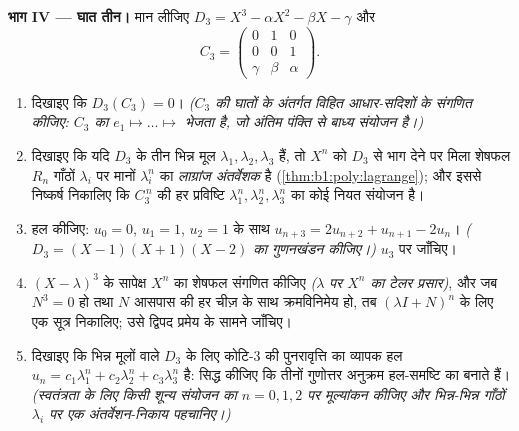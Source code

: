 \begin{problem}
\medskip \noindent\textbf{भाग IV --- घात तीन।} मान लीजिए $D_3 = X^3 - \alpha
X^2 - \beta X - \gamma$ और
\[
C_3 = \begin{pmatrix} 0 & 1 & 0\\ 0 & 0 & 1\\ \gamma & \beta &
\alpha \end{pmatrix}.
\]
\begin{enumerate}[resume]
  \item दिखाइए कि $D_3(C_3) = 0$। \emph{($C_3$ की घातों के अंतर्गत विहित
  आधार-सदिशों के  संगणित कीजिए: $C_3$ का  $e_1 \mapsto
  \dots \mapsto$ भेजता है, जो अंतिम पंक्ति से बाध्य संयोजन है।)}
  \item दिखाइए कि यदि $D_3$ के तीन भिन्न मूल $\lambda_1, \lambda_2,
  \lambda_3$ हैं, तो $X^n$ को $D_3$ से भाग देने पर मिला शेषफल $R_n$ गाँठों
  $\lambda_i$ पर मानों $\lambda_i^n$ का \emph{लाग्रांज अंतर्वेशक} है
  (\cref{thm:b1:poly:lagrange}); और इससे निष्कर्ष निकालिए कि $C_3^{\,n}$ की
  हर प्रविष्टि $\lambda_1^n, \lambda_2^n, \lambda_3^n$ का कोई नियत 
  संयोजन है।
  \item हल कीजिए: $u_0 = 0$, $u_1 = 1$, $u_2 = 1$ के साथ $u_{n+3} = 2u_{n+2}
  + u_{n+1} - 2u_n$। \emph{($D_3 = (X - 1)(X + 1)(X - 2)$ का गुणनखंडन
  कीजिए।)} $u_3$ पर जाँचिए।
  \item $(X - \lambda)^3$ के सापेक्ष $X^n$ का शेषफल संगणित कीजिए
  \emph{($\lambda$ पर $X^n$ का टेलर प्रसार)}, और जब $N^3 = 0$ हो तथा $N$
  आसपास की हर चीज़ के साथ क्रमविनिमेय हो, तब $(\lambda I + N)^n$ के लिए एक
  सूत्र निकालिए; उसे द्विपद प्रमेय के सामने जाँचिए।
  \item दिखाइए कि भिन्न मूलों वाले $D_3$ के लिए कोटि-$3$ की पुनरावृत्ति का
  व्यापक हल $u_n = c_1 \lambda_1^n + c_2\lambda_2^n + c_3\lambda_3^n$ है:
  सिद्ध कीजिए कि तीनों गुणोत्तर अनुक्रम हल-समष्टि का  बनाते हैं।
  \emph{(स्वतंत्रता के लिए किसी शून्य संयोजन का $n = 0, 1, 2$ पर मूल्यांकन
  कीजिए और भिन्न-भिन्न गाँठों $\lambda_i$ पर एक अंतर्वेशन-निकाय पहचानिए।)}
\end{enumerate}


\end{problem}
